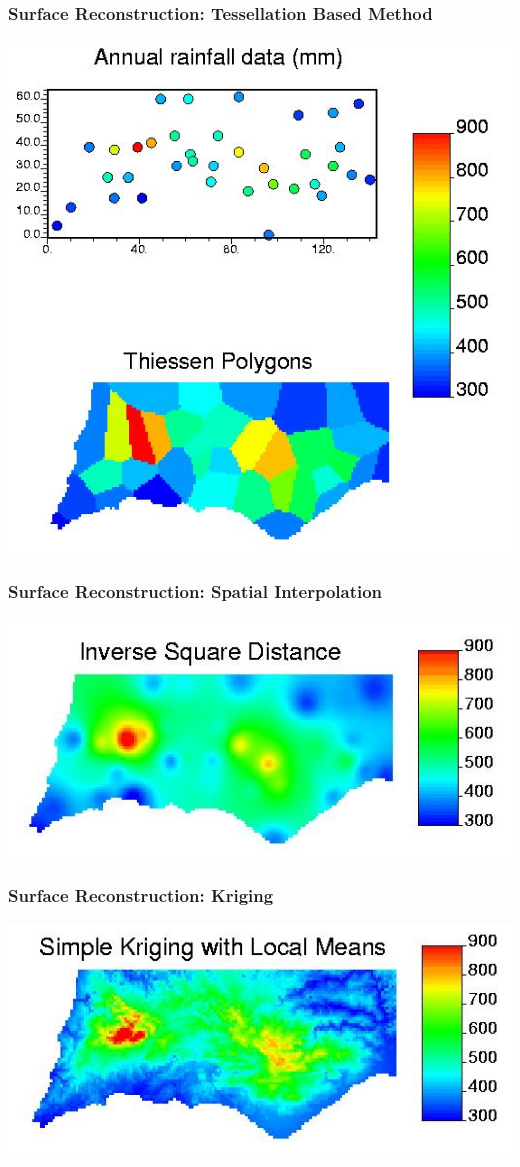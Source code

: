 \documentclass[nototal]{beamer}
\begin{document}
\begin{frame}
    \frametitle{Surface Reconstruction: Tessellation Based Method}
    \begin{center}
      \includegraphics[width=.65\linewidth]{pg2.jpg}
    \end{center}
  \end{frame}
\begin{frame}
    \frametitle{Surface Reconstruction: Spatial Interpolation}
    \begin{center}
      \includegraphics[width=.65\linewidth]{pg3.jpg}
    \end{center}
  \end{frame}
\begin{frame}
    \frametitle{Surface Reconstruction: Kriging}
    \begin{center}
      \includegraphics[width=.65\linewidth]{pg4.jpg}
    \end{center}
  \end{frame}
\end{document}
